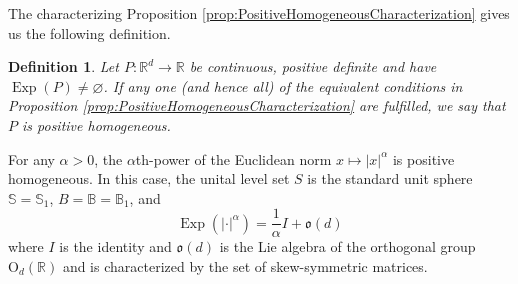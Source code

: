 \documentclass[11pt, letter]{book}
\newtheorem{definition}[theorem]{Definition}
\newenvironment{example}
  {\pushQED{\qed}\renewcommand{\qedsymbol}{$\triangle$}\examplex}
  {\popQED\endexamplex}
\newcommand\OdR{\mbox{O}_d(\mathbb{R})} %
\newcommand\Exp{\operatorname{Exp}}
\begin{document}
\noindent The characterizing Proposition \ref{prop:PositiveHomogeneousCharacterization} gives us the following definition. 
\begin{framed}
\begin{definition}\label{def:pos-hom-fns}
Let $P:\mathbb{R}^d\to\mathbb{R}$ be continuous, positive definite and have $\Exp(P)\neq \varnothing$. If any one (and hence all) of the equivalent conditions in Proposition \ref{prop:PositiveHomogeneousCharacterization} are fulfilled, we say that $P$ is positive homogeneous.
\end{definition}
\end{framed}




\begin{example}\label{exp:EuclideanNorm}\normalfont
For any $\alpha>0$, the $\alpha$th-power of the Euclidean norm $x\mapsto |x|^\alpha$ is positive homogeneous.  In this case, the unital level set $S$ is the standard unit sphere $\mathbb{S}=\mathbb{S}_1$, $B=\mathbb{B}=\mathbb{B}_1$, and
\begin{equation*}
    \Exp(|\cdot|^\alpha)=\frac{1}{\alpha}I+\mathfrak{o}(d)
\end{equation*}
where $I$ is the identity and $\mathfrak{o}(d)$ is the Lie algebra of the orthogonal group $\OdR$ and is characterized by the set of skew-symmetric matrices. 
\end{example}
\end{document}
